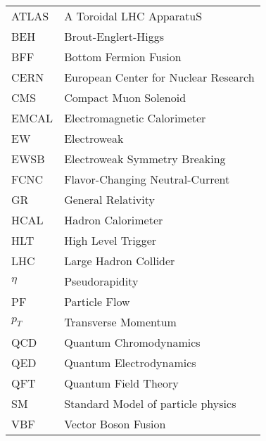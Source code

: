 \hspace*{-1.25in}
\vspace{12pt}
\begin{spacing}{1.0}
	\begin{longtable}[htbp]{@{}p{} p{}@{}}
		ATLAS	&	A Toroidal LHC ApparatuS\\	[2ex]
		BEH	&	Brout-Englert-Higgs\\	[2ex]
		BFF	&	Bottom Fermion Fusion\\	[2ex]
		CERN & European Center for Nuclear Research\\ [2ex]
		CMS	&	Compact Muon Solenoid\\	[2ex]		
		EMCAL & Electromagnetic Calorimeter\\ [2ex]
		EW	&	Electroweak\\	[2ex]
		EWSB	&	Electroweak Symmetry Breaking\\	[2ex]	
		FCNC &  Flavor-Changing Neutral-Current\\  [2ex]
		GR &  General Relativity\\  [2ex]		
		HCAL & Hadron Calorimeter\\ [2ex]
		HLT  & High Level Trigger\\ [2ex]	
		LHC  & Large Hadron Collider\\ [2ex]
		$\eta$ & Pseudorapidity\\ [2ex]
		PF   & Particle Flow\\ [2ex]
		$p_{T}$ & Transverse Momentum\\ [2ex]		
		QCD	&	Quantum Chromodynamics\\	[2ex]
		QED	&	Quantum Electrodynamics\\	[2ex]		
		QFT	&	Quantum Field Theory\\	[2ex]
		SM	&	Standard Model of particle physics\\	[2ex]
		VBF	&	Vector Boson Fusion\\	[2ex]
	\end{longtable}
\end{spacing}

\pagebreak{}